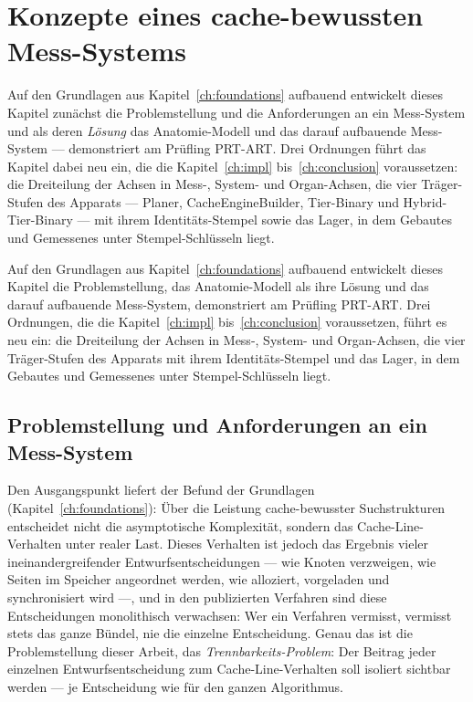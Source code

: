 \chapter{Konzepte eines cache-bewussten Mess-Systems}\label{ch:measurement}


\begin{nurlang}
Auf den Grundlagen aus Kapitel~\ref{ch:foundations} aufbauend entwickelt dieses Kapitel zunächst die
Problemstellung und die Anforderungen an ein Mess-System und als deren \emph{Lösung} das Anatomie-Modell
und das darauf aufbauende Mess-System --- demonstriert am Prüfling PRT-ART\@. Drei Ordnungen führt das
Kapitel dabei neu ein, die die Kapitel~\ref{ch:impl} bis~\ref{ch:conclusion} voraussetzen: die
Dreiteilung der Achsen in Mess-, System- und Organ-Achsen, die vier Träger-Stufen des Apparats ---
Planer, CacheEngineBuilder, Tier-Binary und Hybrid-Tier-Binary --- mit ihrem Identitäts-Stempel sowie
das Lager, in dem Gebautes und Gemessenes unter Stempel-Schlüsseln liegt.
\end{nurlang}
\begin{nurkurz}
Auf den Grundlagen aus Kapitel~\ref{ch:foundations} aufbauend entwickelt dieses Kapitel die Problemstellung, das
Anatomie-Modell als ihre Lösung und das darauf aufbauende Mess-System, demonstriert am Prüfling PRT-ART\@. Drei
Ordnungen, die die Kapitel~\ref{ch:impl} bis~\ref{ch:conclusion} voraussetzen, führt es neu ein: die Dreiteilung
der Achsen in Mess-, System- und Organ-Achsen, die vier Träger-Stufen des Apparats mit ihrem Identitäts-Stempel
und das Lager, in dem Gebautes und Gemessenes unter Stempel-Schlüsseln liegt.
\end{nurkurz}

\section{Problemstellung und Anforderungen an ein Mess-System}\label{sec:task-concerns}
Den Ausgangspunkt liefert der Befund der Grundlagen (Kapitel~\ref{ch:foundations}): Über die Leistung
cache-bewusster Suchstrukturen entscheidet nicht die asymptotische Komplexität, sondern das
Cache-Line-Verhalten unter realer Last. Dieses Verhalten ist jedoch das Ergebnis vieler
ineinandergreifender Entwurfsentscheidungen --- wie Knoten verzweigen, wie Seiten im Speicher angeordnet
werden, wie alloziert, vorgeladen und synchronisiert wird ---, und in den publizierten Verfahren sind
diese Entscheidungen monolithisch verwachsen: Wer ein Verfahren vermisst, vermisst stets das ganze
Bündel, nie die einzelne Entscheidung. Genau das ist die Problemstellung dieser Arbeit, das
\emph{Trennbarkeits-Problem}: Der Beitrag jeder einzelnen Entwurfsentscheidung zum Cache-Line-Verhalten
soll isoliert sichtbar werden --- je Entscheidung wie für den ganzen Algorithmus.

